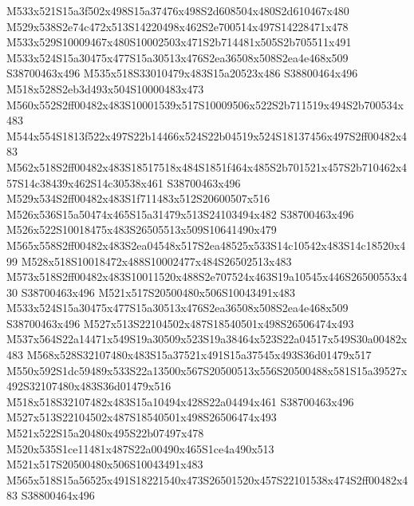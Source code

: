 \documentclass{article}
\begin{document}
\begin{multicols}{2}



M533x521S15a3f502x498S15a37476x498S2d608504x480S2d610467x480 M529x538S2e74c472x513S14220498x462S2e700514x497S14228471x478 M533x529S10009467x480S10002503x471S2b714481x505S2b705511x491 M533x524S15a30475x477S15a30513x476S2ea36508x508S2ea4e468x509 S38700463x496 M535x518S33010479x483S15a20523x486 S38800464x496 M518x528S2eb3d493x504S10000483x473 M560x552S2ff00482x483S10001539x517S10009506x522S2b711519x494S2b700534x483 M544x554S1813f522x497S22b14466x524S22b04519x524S18137456x497S2ff00482x483 M562x518S2ff00482x483S18517518x484S1851f464x485S2b701521x457S2b710462x457S14c38439x462S14c30538x461 S38700463x496 M529x534S2ff00482x483S1f711483x512S20600507x516 M526x536S15a50474x465S15a31479x513S24103494x482 S38700463x496 M526x522S10018475x483S26505513x509S10641490x479 M565x558S2ff00482x483S2ea04548x517S2ea48525x533S14c10542x483S14c18520x499 M528x518S10018472x488S10002477x484S26502513x483 M573x518S2ff00482x483S10011520x488S2e707524x463S19a10545x446S26500553x430 S38700463x496 M521x517S20500480x506S10043491x483 M533x524S15a30475x477S15a30513x476S2ea36508x508S2ea4e468x509 S38700463x496 M527x513S22104502x487S18540501x498S26506474x493 M537x564S22a14471x549S19a30509x523S19a38464x523S22a04517x549S30a00482x483 M568x528S32107480x483S15a37521x491S15a37545x493S36d01479x517 M550x592S1dc59489x533S22a13500x567S20500513x556S20500488x581S15a39527x492S32107480x483S36d01479x516 M518x518S32107482x483S15a10494x428S22a04494x461 S38700463x496 M527x513S22104502x487S18540501x498S26506474x493 M521x522S15a20480x495S22b07497x478 M520x535S1ce11481x487S22a00490x465S1ce4a490x513 M521x517S20500480x506S10043491x483 M565x518S15a56525x491S18221540x473S26501520x457S22101538x474S2ff00482x483 S38800464x496



\end{multicols}
\end{document}
